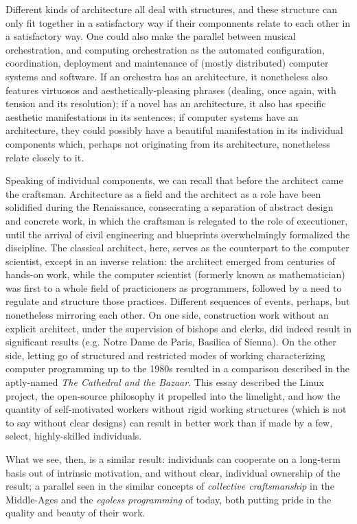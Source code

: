 \documentclass{article}
\begin{document}
Different kinds of architecture all deal with structures, and these structure can only fit together in a satisfactory way if their componnents relate to each other in a satisfactory way. One could also make the parallel between musical orchestration, and computing orchestration as the automated configuration, coordination, deployment and maintenance of (mostly distributed) computer systems and software. If an orchestra has an architecture, it nonetheless also features virtuosos and aesthetically-pleasing phrases (dealing, once again, with tension and its resolution); if a novel has an architecture, it also has specific aesthetic manifestations in its sentences; if computer systems have an architecture, they could possibly have a beautiful manifestation in its individual components which, perhaps not originating from its architecture, nonetheless relate closely to it.

Speaking of individual components, we can recall that before the architect came the craftsman. Architecture as a field and the architect as a role have been solidified during the Renaissance, consecrating a separation of abstract design and concrete work, in which the craftsman is relegated to the role of executioner, until the arrival of civil engineering and blueprints overwhelmingly formalized the discipline. The classical architect, here, serves as the counterpart to the computer scientist, except in an inverse relation: the architect emerged from centuries of hands-on work, while the computer scientist (formerly known as mathematician) was first to a whole field of practicioners as programmers, followed by a need to regulate and structure those practices. Different sequences of events, perhaps, but nonetheless mirroring each other. On one side, construction work without an explicit architect, under the supervision of bishops and clerks, did indeed result in significant results (e.g. Notre Dame de Paris, Basilica of Sienna). On the other side, letting go of structured and restricted modes of working characterizing computer programming up to the 1980s resulted in a comparison described in the aptly-named \textit{The Cathedral and the Bazaar}. This essay described the Linux project, the open-source philosophy it propelled into the limelight, and how the quantity of self-motivated workers without rigid working structures (which is not to say without clear designs) can result in better work than if made by a few, select, highly-skilled individuals\cite{raymond_cathedral_2001}.

What we see, then, is a similar result: individuals can cooperate on a long-term basis out of intrinsic motivation, and without clear, individual ownership of the result; a parallel seen in the similar concepts of \textit{collective craftsmanship} in the Middle-Ages and the \emph{egoless programming} of today\cite{brooks_mythical_1975}, both putting pride in the quality and beauty of their work.
\end{document}
